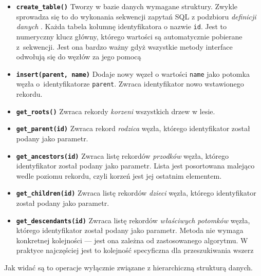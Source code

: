 \begin{itemize}
    \item \textbf{\texttt{create\_table()}}
        Tworzy w bazie danych wymagane struktury.
        Zwykle sprowadza się to do wykonania sekwencji zapytań SQL z podzbioru \emph{definicji danych} .
        Każda tabela kolumnę identyfikatora o nazwie \texttt{id}. 
        Jest to numeryczny klucz główny,
        którego wartości są automatycznie pobierane z~sekwencji.
        Jest ona bardzo ważny gdyż wszystkie metody interface odwołują się do węzłów za jego pomocą
    \item \textbf{\texttt{insert(parent, name)}}
    	Dodaje nowy węzeł o wartości \texttt{name} jako potomka węzła o~identyfikatorze \texttt{parent}.
    	Zwraca identyfikator nowo wstawionego rekordu.
    \item \textbf{\texttt{get\_roots()}}
    	Zwraca rekordy  \emph{korzeni} wszystkich drzew w lesie.
    \item \textbf{\texttt{get\_parent(id)}}
    	Zwraca rekord \emph{rodzica} węzła, którego identyfikator został podany jako parametr.
    \item \textbf{\texttt{get\_ancestors(id)}}
    	Zwraca listę rekordów  \emph{przodków} węzła, którego identyfikator został podany jako parametr.
    	Lista jest posortowana malejąco wedle poziomu rekordu, czyli korzeń jest jej ostatnim elementem.
    \item \textbf{\texttt{get\_children(id)}}
    	Zwraca listę rekordów \emph{dzieci} węzła, którego identyfikator został podany jako parametr.
    \item \textbf{\texttt{get\_descendants(id)}}
    	Zwraca listę rekordów \emph{właściwych potomków} węzła, którego identyfikator został podany jako parametr.
    	Metoda nie wymaga konkretnej kolejności --- jest ona zależna od zastosowanego algorytmu.
    	W praktyce najczęściej jest to kolejność specyficzna dla przeszukiwania wszerz
\end{itemize}

Jak widać są to operacje wyłącznie związane z hierarchiczną strukturą danych.





